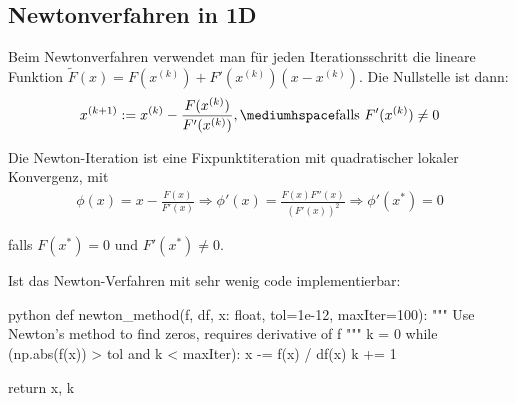 \newsectionNoPB
\subsection{Newtonverfahren in 1D}
Beim Newtonverfahren verwendet man für jeden Iterationsschritt die lineare Funktion $\tilde{F}(x) = F(x^{(k)}) + F'(x^{(k)})(x - x^{(k)})$. Die Nullstelle ist dann:
\rmvspace
\begin{align*}
    x^{(k + 1)} := x^{(k)} - \frac{F(x^{(k)})}{F'(x^{(k)})}, \mediumhspace \text{falls } F'(x^{(k)}) \neq 0
\end{align*}

\inlineremark Die Newton-Iteration ist eine Fixpunktiteration mit quadratischer lokaler Konvergenz, mit
\rmvspace
\begin{align*}
    \phi(x) = x - \frac{F(x)}{F'(x)} \Longrightarrow \phi'(x) = \frac{F(x) F''(x)}{(F'(x))^2} \Longrightarrow \phi'(x^*) = 0
\end{align*}

\drmvspace
falls $F(x^*) = 0$ und $F'(x^*) \neq 0$.

\newpage

\innumpy Ist das Newton-Verfahren mit sehr wenig code implementierbar:

\begin{code}{python}
def newton_method(f, df, x: float, tol=1e-12, maxIter=100):
    """ Use Newton's method to find zeros, requires derivative of f """
    k = 0
    while (np.abs(f(x)) > tol and k < maxIter):
        x -= f(x) / df(x)
        k += 1
    
    return x, k
\end{code}
